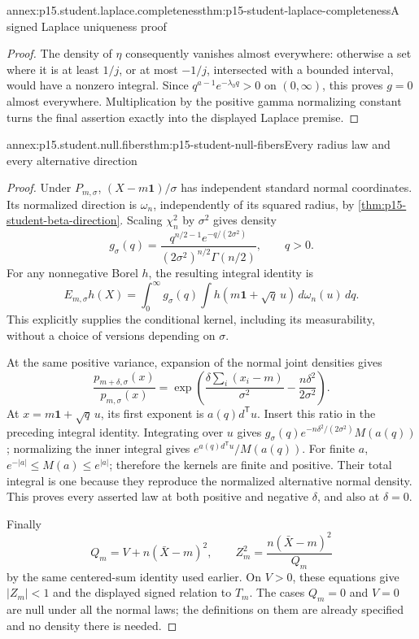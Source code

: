 \begin{annexitem}{annex:p15.student.laplace.completeness}{thm:p15-student-laplace-completeness}{A signed Laplace uniqueness proof}
\begin{proof}
The density of \(\eta\) consequently vanishes almost
everywhere: otherwise a set where it is at least
\(1/j\), or at most \(-1/j\), intersected with a
bounded interval, would have a nonzero integral.
Since \(q^{a-1}e^{-\lambda_0q}>0\) on \((0,\infty)\),
this proves \(g=0\) almost everywhere.
Multiplication by the positive gamma normalizing
constant turns the final assertion exactly into
the displayed Laplace premise.
\end{proof}
\end{annexitem}

\begin{annexitem}{annex:p15.student.null.fibers}{thm:p15-student-null-fibers}{Every radius law and every alternative direction}
\begin{proof}
Under \(P_{m,\sigma}\),
\((X-m\mathbf1)/\sigma\) has independent standard
normal coordinates. Its normalized direction is
\(\omega_n\), independently of its squared radius,
by \cref{thm:p15-student-beta-direction}.
Scaling \(\chi_n^2\) by \(\sigma^2\) gives density
\[
 g_\sigma(q)=
 \frac{q^{n/2-1}e^{-q/(2\sigma^2)}}
           {(2\sigma^2)^{n/2}\Gamma(n/2)},\qquad q>0.
\]
For any nonnegative Borel \(h\), the resulting
integral identity is
\[
 E_{m,\sigma}h(X)
   =\int_0^\infty g_\sigma(q)
       \int h(m\mathbf1+\sqrt q\,u)\,d\omega_n(u)\,dq.
\]
This explicitly supplies the conditional kernel,
including its measurability, without a choice of
versions depending on \(\sigma\).

At the same positive variance, expansion of the
normal joint densities gives
\[
 \frac{p_{m+\delta,\sigma}(x)}{p_{m,\sigma}(x)}
       =\exp\!\left(
          \frac{\delta\sum_i(x_i-m)}{\sigma^2}
                       -\frac{n\delta^2}{2\sigma^2}\right).
\]
At \(x=m\mathbf1+\sqrt q\,u\), its first exponent
is \(a(q)d^{\mathsf T}u\).
Insert this ratio in the preceding integral
identity. Integrating over \(u\) gives
\(g_\sigma(q)e^{-n\delta^2/(2\sigma^2)}M(a(q))\);
normalizing the inner integral gives
\(e^{a(q)d^{\mathsf T}u}/M(a(q))\).
For finite \(a\), \(e^{-|a|}\leq M(a)\leq e^{|a|}\);
therefore the kernels are finite and positive.
Their total integral is one because they reproduce
the normalized alternative normal density.
This proves every asserted law at both positive
and negative \(\delta\), and also at \(\delta=0\).

Finally
\[
 Q_m=V+n(\bar X-m)^2,\qquad
 Z_m^2=\frac{n(\bar X-m)^2}{Q_m}
\]
by the same centered-sum identity used earlier.
On \(V>0\), these equations give \(|Z_m|<1\)
and the displayed signed relation to \(T_m\).
The cases \(Q_m=0\) and \(V=0\) are null under
all the normal laws; the definitions on them are
already specified and no density there is needed.
\end{proof}
\end{annexitem}

